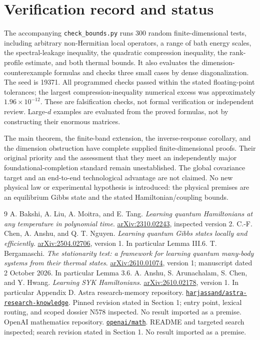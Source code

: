 \documentclass[11pt]{article}
\theoremstyle{remark}\newtheorem{remark}[theorem]{Remark}
\begin{document}
\section{Verification record and status}
The accompanying \texttt{check\_bounds.py} runs 300 random finite-dimensional tests, including arbitrary non-Hermitian local operators, a range of bath energy scales, the spectral-leakage inequality, the quadratic compression inequality, the rank-profile estimate, and both thermal bounds. It also evaluates the dimension-counterexample formulas and checks three small cases by dense diagonalization. The seed is 19371. All programmed checks passed within the stated floating-point tolerances; the largest compression-inequality numerical excess was approximately $1.96\times10^{-12}$. These are falsification checks, not formal verification or independent review. Large-$d$ examples are evaluated from the proved formulas, not by constructing their enormous matrices.

The main theorem, the finite-band extension, the inverse-response corollary, and the dimension obstruction have complete supplied finite-dimensional proofs. Their original priority and the assessment that they meet an independently major foundational-completion standard remain unestablished. The global covariance target and an end-to-end technological advantage are not claimed. No new physical law or experimental hypothesis is introduced: the physical premises are an equilibrium Gibbs state and the stated Hamiltonian/coupling bounds.

\begin{thebibliography}{9}\small
{} A. Bakshi, A. Liu, A. Moitra, and E. Tang.
\emph{Learning quantum Hamiltonians at any temperature in polynomial time}.
\href{https://arxiv.org/abs/2310.02243}{arXiv:2310.02243}, inspected version 2.
 C.-F. Chen, A. Anshu, and Q. T. Nguyen.
\emph{Learning quantum Gibbs states locally and efficiently}.
\href{https://arxiv.org/abs/2504.02706}{arXiv:2504.02706}, version 1. In particular Lemma III.6.
 T. Bergamaschi.
\emph{The stationarity test: a framework for learning quantum many-body systems from their thermal states}.
\href{https://arxiv.org/abs/2610.01074}{arXiv:2610.01074}, version 1; manuscript dated 2 October 2026. In particular Lemma 3.6.
 A. Anshu, S. Arunachalam, S. Chen, and Y. Hwang.
\emph{Learning SYK Hamiltonians}.
\href{https://arxiv.org/abs/2610.02178}{arXiv:2610.02178}, version 1. In particular Appendix D.
 Astra research-memory repository.
\href{https://github.com/harjassand/astra-research-knowledge}{\nolinkurl{harjassand/astra-research-knowledge}}.
Pinned revision stated in Section 1; entry point, lexical routing, and scoped dossier N578 inspected. No result imported as a premise.
 OpenAI mathematics repository.
\href{https://github.com/openai/math}{\nolinkurl{openai/math}}.
README and targeted search inspected; search revision stated in Section 1. No result imported as a premise.
\end{thebibliography}
\end{document}
